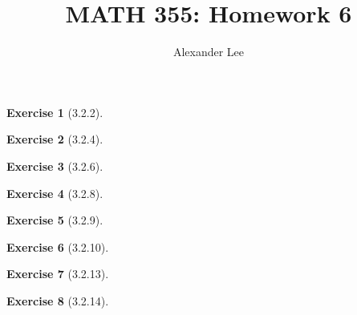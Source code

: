 \documentclass{amsart}
\title{MATH 355: Homework 6}
\author{Alexander Lee}
\theoremstyle{definition}
\newtheorem{exercise}{Exercise}
\begin{document}
\maketitle

\begin{exercise}[3.2.2]
\end{exercise}

\begin{exercise}[3.2.4]
\end{exercise}

\begin{exercise}[3.2.6]
\end{exercise}

\begin{exercise}[3.2.8]
\end{exercise}

\begin{exercise}[3.2.9]
\end{exercise}


\begin{exercise}[3.2.10]
\end{exercise}

\begin{exercise}[3.2.13]
\end{exercise}

\begin{exercise}[3.2.14]
\end{exercise}
\end{document}
